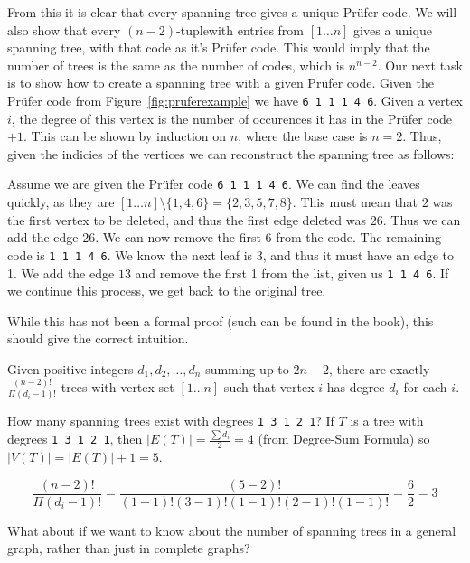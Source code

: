 From this it is clear that every spanning tree gives a unique Prüfer code. We will also show that every $(n-2)$-tuplewith entries from $[1 \ldots n ]$ gives a unique spanning tree, with that code as it's Prüfer code. This would imply that the number of trees is the same as the number of codes, which is $n^{n-2}$. Our next task is to show how to create a spanning tree with a given Prüfer code. Given the Prüfer code from Figure~\ref{fig:pruferexample} we have \texttt{6 1 1 1 4 6}. Given a vertex $i$, the degree of this vertex is the number of occurences it has in the Prüfer code $+1$. This can be shown by induction on $n$, where the base case is $n=2$. Thus, given the indicies of the vertices we can reconstruct the spanning tree as follows:

Assume we are given the Prüfer code \texttt{6 1 1 1 4 6}. We can find the leaves quickly, as they are $[1 \ldots n] \setminus \{1, 4, 6\} = \{2, 3, 5, 7, 8\}$. This must mean that $2$ was the first vertex to be deleted, and thus the first edge deleted was $26$. Thus we can add the edge $26$. We can now remove the first 6 from the code. The remaining code is \texttt{1 1 1 4 6}. We know the next leaf is 3, and thus it must have an edge to 1. We add the edge $13$ and remove the first 1 from the list, given us \texttt{1 1 4 6}. If we continue this process, we get back to the original tree.

While this has not been a formal proof (such can be found in the book), this should give the correct intuition.

\begin{corollary}
	Given positive integers $d_{1}, d_{2}, \ldots, d_{n}$ summing up to $2n-2$, there are exactly $\frac{(n-2)!}{\Pi (d_{i}-1)!}$ trees with vertex set $[1 \ldots n]$ such that vertex $i$  has degree $d_{i}$ for each $i$.
\end{corollary}

How many spanning trees exist with degrees \texttt{1 3 1 2 1}? If $T$ is a tree with degrees \texttt{1 3 1 2 1}, then $|E(T)| = \frac{\sum d_{i}}{2} = 4$ (from Degree-Sum Formula) so $|V(T)| = |E(T)| + 1 = 5$.

\begin{equation*}
	\frac{(n-2)!}{\Pi (d_{i}-1)!} = \frac{(5-2)!}{(1-1)!(3-1)!(1-1)!(2-1)!(1-1)!} = \frac{6}{2} = 3
\end{equation*}

What about if we want to know about the number of spanning trees in a general graph, rather than just in complete graphs?

